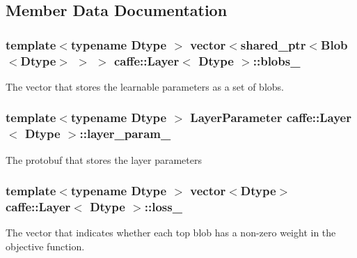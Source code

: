 \subsection{Member Data Documentation}
\subsubsection[{\texorpdfstring{blobs\+\_\+}{blobs_}}]{\setlength{\rightskip}{0pt plus 5cm}template$<$typename Dtype $>$ vector$<$shared\+\_\+ptr$<${\bf Blob}$<$Dtype$>$ $>$ $>$ {\bf caffe\+::\+Layer}$<$ Dtype $>$\+::blobs\+\_\+\hspace{0.3cm}{\ttfamily [protected]}}\hypertarget{classcaffe_1_1Layer_a8073fcf2c139b47eb99ce71b346b1321}{}\label{classcaffe_1_1Layer_a8073fcf2c139b47eb99ce71b346b1321}
The vector that stores the learnable parameters as a set of blobs. 
\subsubsection[{\texorpdfstring{layer\+\_\+param\+\_\+}{layer_param_}}]{\setlength{\rightskip}{0pt plus 5cm}template$<$typename Dtype $>$ Layer\+Parameter {\bf caffe\+::\+Layer}$<$ Dtype $>$\+::layer\+\_\+param\+\_\+\hspace{0.3cm}{\ttfamily [protected]}}\hypertarget{classcaffe_1_1Layer_a7ed12bb2df25c887e41d7ea9557fc701}{}\label{classcaffe_1_1Layer_a7ed12bb2df25c887e41d7ea9557fc701}
The protobuf that stores the layer parameters 
\subsubsection[{\texorpdfstring{loss\+\_\+}{loss_}}]{\setlength{\rightskip}{0pt plus 5cm}template$<$typename Dtype $>$ vector$<$Dtype$>$ {\bf caffe\+::\+Layer}$<$ Dtype $>$\+::loss\+\_\+\hspace{0.3cm}{\ttfamily [protected]}}\hypertarget{classcaffe_1_1Layer_af6d347229a139500994e7a926c680486}{}\label{classcaffe_1_1Layer_af6d347229a139500994e7a926c680486}
The vector that indicates whether each top blob has a non-\/zero weight in the objective function. 
